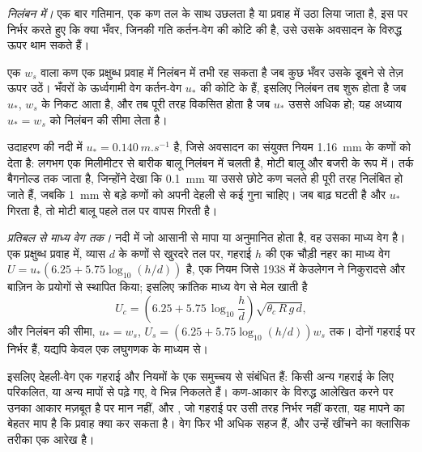 \emph{निलंबन में।} एक बार गतिमान, एक कण तल के साथ उछलता है या प्रवाह में उठा लिया जाता है, इस पर निर्भर करते हुए कि क्या भँवर, जिनकी गति कर्तन-वेग की कोटि की है, उसे उसके अवसादन के विरुद्ध ऊपर थाम सकते हैं।

\begin{proposition}[निलंबन का मानदंड]
\label{prop:b1:erosion-transport:suspension}
एक  $w_s$ वाला कण एक प्रक्षुब्ध प्रवाह में निलंबन में तभी रह सकता है जब कुछ भँवर उसके डूबने से तेज़ ऊपर उठें। भँवरों के ऊर्ध्वगामी वेग कर्तन-वेग $u_*$ की कोटि के हैं, इसलिए निलंबन तब शुरू होता है जब $u_*$, $w_s$ के निकट आता है, और तब पूरी तरह विकसित होता है जब $u_*$ उससे अधिक हो; यह अध्याय $u_* = w_s$ को निलंबन की सीमा लेता है।
\end{proposition}
\admitted

उदाहरण की नदी में $u_* = \qty{0.140}{m.s^{-1}}$ है, जिसे अवसादन का संयुक्त नियम \qty{1.16}{mm} के कणों को देता है: लगभग एक मिलीमीटर से बारीक बालू निलंबन में चलती है, मोटी बालू और बजरी  के रूप में। तर्क बैगनोल्ड तक जाता है, जिन्होंने देखा कि \qty{0.1}{mm} या उससे छोटे कण चलते ही पूरी तरह निलंबित हो जाते हैं, जबकि \qty{1}{mm} से बड़े कणों को अपनी देहली से कई गुना  चाहिए। जब बाढ़ घटती है और $u_*$ गिरता है, तो मोटी बालू पहले तल पर वापस गिरती है।

\emph{प्रतिबल से माध्य वेग तक।} नदी में जो आसानी से मापा या अनुमानित होता है, वह उसका माध्य वेग है। एक प्रक्षुब्ध प्रवाह में, व्यास $d$ के कणों से खुरदरे तल पर, गहराई $h$ की एक चौड़ी नहर का माध्य वेग $U = u_*\left(6.25 + 5.75\log_{10}(h/d)\right)$ है, एक नियम जिसे 1938 में केउलेगन ने निकुरादसे और बाज़िन के प्रयोगों से स्थापित किया; इसलिए  क्रांतिक माध्य वेग से मेल खाती है
\[
  U_c = \left(6.25 + 5.75\,\log_{10}\frac{h}{d}\right)\sqrt{\theta_c\,R\,g\,d},
\]
और निलंबन की सीमा, $u_* = w_s$, $U_s = \left(6.25 +
5.75\log_{10}(h/d)\right) w_s$ तक। दोनों गहराई पर निर्भर हैं, यद्यपि केवल एक लघुगणक के माध्यम से।

इसलिए देहली-वेग एक गहराई और नियमों के एक समुच्चय से संबंधित हैं: किसी अन्य गहराई के लिए परिकलित, या अन्य मापों से पढ़े गए, वे भिन्न निकलते हैं। कण-आकार के विरुद्ध आलेखित करने पर उनका आकार मज़बूत है पर मान नहीं, और , जो गहराई पर उसी तरह निर्भर नहीं करता, यह मापने का बेहतर माप है कि प्रवाह क्या कर सकता है। वेग फिर भी अधिक सहज हैं, और उन्हें खींचने का क्लासिक तरीका एक आरेख है।

